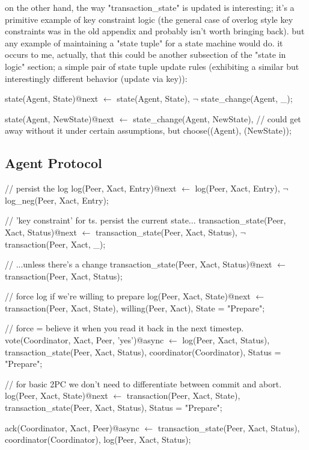 on the other hand, the way "transaction\_state" is updated is interesting; it's a primitive example of key constraint logic (the general case of 
overlog style key constraints was in the old appendix and probably isn't worth bringing back).  but any example of maintaining a "state tuple" 
for a state machine would do.  it occurs to me, actually, that this could be another subsection of the "state in logic" section; a simple pair of state 
tuple update rules (exhibiting a similar but interestingly different behavior (update via key)):

\begin{Dedalus}
state(Agent, State)@next \(\leftarrow\)
  state(Agent, State),
  \(\lnot\) state\_change(Agent, _);

state(Agent, NewState)@next \(\leftarrow\)
  state_change(Agent, NewState),
  // could get away without it under certain assumptions, but
  choose((Agent), (NewState));
\end{Dedalus}

\subsection{Agent Protocol}

\begin{Dedalus}
\small
// persist the log
log(Peer, Xact, Entry)@next \(\leftarrow\)
    log(Peer, Xact, Entry),
    \(\lnot\) log\_neg(Peer, Xact, Entry);

// 'key constraint' for ts.  persist the current state...
transaction_state(Peer, Xact, Status)@next \(\leftarrow\)
    transaction\_state(Peer, Xact, Status),
    \(\lnot\) transaction(Peer, Xact, _);

// ...unless there's a change
transaction_state(Peer, Xact, Status)@next \(\leftarrow\)
    transaction(Peer, Xact, Status);


// force log if we're willing to prepare
log(Peer, Xact, State)@next \(\leftarrow\)
    transaction(Peer, Xact, State),
    willing(Peer, Xact),
    State = "Prepare";

// force = believe it when you read it back in the next timestep.
vote(Coordinator, Xact, Peer, 'yes')@async \(\leftarrow\)
    log(Peer, Xact, Status),
    transaction_state(Peer, Xact, Status),
    coordinator(Coordinator),
    Status = "Prepare";


// for basic 2PC we don't need to differentiate between commit and abort.
log(Peer, Xact, State)@next \(\leftarrow\)
    transaction(Peer, Xact, State),
    transaction_state(Peer, Xact, Status),
    Status = "Prepare";


ack(Coordinator, Xact, Peer)@async \(\leftarrow\)
    transaction_state(Peer, Xact, Status),
    coordinator(Coordinator),
    log(Peer, Xact, Status);
   
   
\end{Dedalus}   


